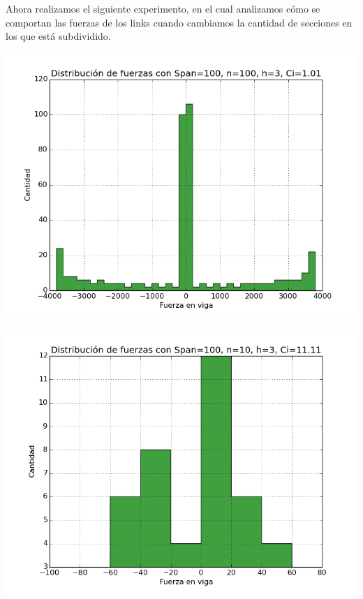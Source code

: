 Ahora realizamos el siguiente experimento, en el cual analizamos cómo se comportan las fuerzas de los links cuando cambiamos la cantidad de secciones en los que está subdividido.\\

\begin{center}
\includegraphics[scale=0.8]{archivos/graficos/hist_n100_C100.png}\\
\end{center}

\begin{center}
\includegraphics[scale=0.8]{archivos/graficos/hist_n10_C100.png}\\
\end{center}

